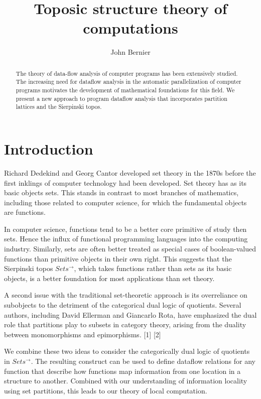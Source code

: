 \documentclass[a4paper,11pt, notitlepage]{report}
\title{Toposic structure theory of computations}
\author{John Bernier}
\theoremstyle{definition}
\begin{document}
\maketitle
\begin{abstract}
The theory of data-flow analysis of computer programs has been extensively studied. The increasing need for dataflow analysis in the automatic parallelization of computer programs motivates the development of mathematical foundations for this field. We present a new approach to program dataflow analysis that incorporates partition lattices and the Sierpinski topos.
\end{abstract}

\tableofcontents

\chapter{Introduction}
Richard Dedekind and Georg Cantor developed set theory in the 1870s before the first inklings of computer technology had been developed. Set theory has as its basic objects sets. This stands in contrast to most branches of mathematics, including those related to computer science, for which the fundamental objects are functions.

In computer science, functions tend to be a better core primitive of study then sets. Hence the influx of functional programming languages into the computing industry. Similarly, sets are often better treated as special cases of boolean-valued functions than primitive objects in their own right. This suggests that the Sierpinski topos $Sets^{\to}$, which takes functions rather than sets as its basic objects, is a better foundation for most applications than set theory.

A second issue with the traditional set-theoretic approach is its overreliance on subobjects to the detriment of the categorical dual logic of quotients. Several authors, including David Ellerman and Giancarlo Rota, have emphasized the dual role that partitions play to subsets in category theory, arising from the duality between monomorphisms and epimorphisms. [1] [2]

We combine these two ideas to consider the categorically dual logic of quotients in $Sets^{\to}$. The resulting construct can be used to define dataflow relations for any function that describe how functions map information from one location in a structure to another. Combined with our understanding of information locality using set partitions, this leads to our theory of local computation.
\end{document}
